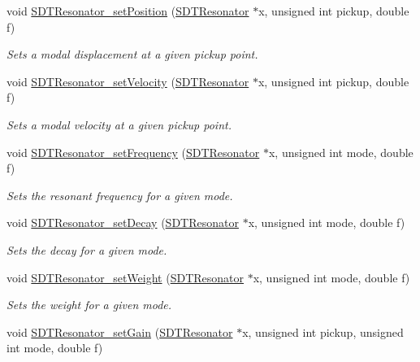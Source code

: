 \begin{DoxyCompactItemize}
void \hyperlink{group__resonators_gabdb2a89ef8f1d6cd606c5260fa722b20}{S\+D\+T\+Resonator\+\_\+set\+Position} (\hyperlink{group__resonators_ga07d183de45e9713277c8f62d93d9be9c}{S\+D\+T\+Resonator} $\ast$x, unsigned int pickup, double f)
\begin{DoxyCompactList}\small\item\em Sets a modal displacement at a given pickup point. \end{DoxyCompactList}\item 
void \hyperlink{group__resonators_ga7197d7390bb6367a9f92df741750c4cc}{S\+D\+T\+Resonator\+\_\+set\+Velocity} (\hyperlink{group__resonators_ga07d183de45e9713277c8f62d93d9be9c}{S\+D\+T\+Resonator} $\ast$x, unsigned int pickup, double f)
\begin{DoxyCompactList}\small\item\em Sets a modal velocity at a given pickup point. \end{DoxyCompactList}\item 
void \hyperlink{group__resonators_gaf185ee761f1b70d09c6e276cabb2ddcd}{S\+D\+T\+Resonator\+\_\+set\+Frequency} (\hyperlink{group__resonators_ga07d183de45e9713277c8f62d93d9be9c}{S\+D\+T\+Resonator} $\ast$x, unsigned int mode, double f)
\begin{DoxyCompactList}\small\item\em Sets the resonant frequency for a given mode. \end{DoxyCompactList}\item 
void \hyperlink{group__resonators_gac293efb03ca211634197a7887c69a022}{S\+D\+T\+Resonator\+\_\+set\+Decay} (\hyperlink{group__resonators_ga07d183de45e9713277c8f62d93d9be9c}{S\+D\+T\+Resonator} $\ast$x, unsigned int mode, double f)
\begin{DoxyCompactList}\small\item\em Sets the decay for a given mode. \end{DoxyCompactList}\item 
void \hyperlink{group__resonators_ga7365dc7fc9896494094b1cb341e47b44}{S\+D\+T\+Resonator\+\_\+set\+Weight} (\hyperlink{group__resonators_ga07d183de45e9713277c8f62d93d9be9c}{S\+D\+T\+Resonator} $\ast$x, unsigned int mode, double f)
\begin{DoxyCompactList}\small\item\em Sets the weight for a given mode. \end{DoxyCompactList}\item 
void \hyperlink{group__resonators_ga9a59408adcd1852b4c448f96972a1c42}{S\+D\+T\+Resonator\+\_\+set\+Gain} (\hyperlink{group__resonators_ga07d183de45e9713277c8f62d93d9be9c}{S\+D\+T\+Resonator} $\ast$x, unsigned int pickup, unsigned int mode, double f)

\end{DoxyCompactItemize}

